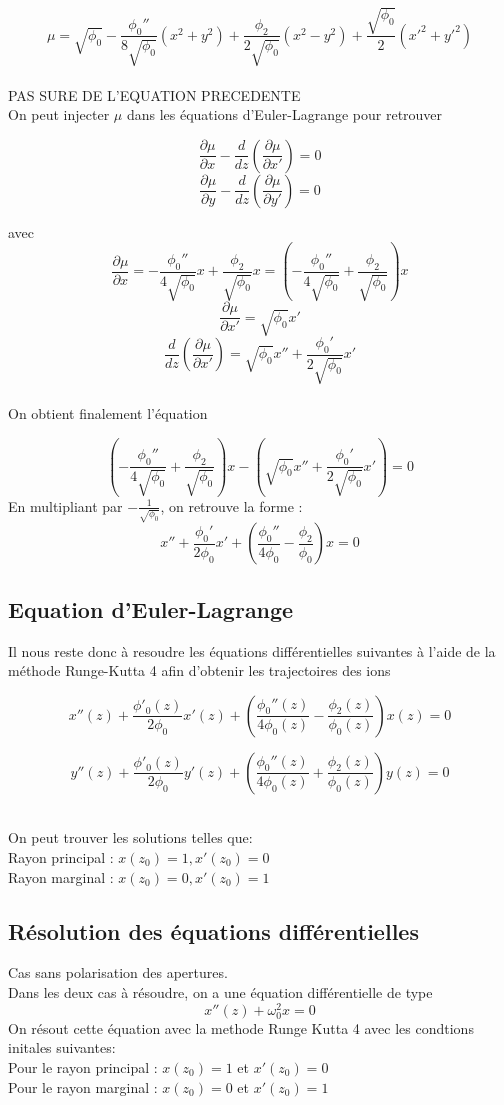\documentclass{article}
\begin{document}
\[
\mu = \sqrt{\phi_0}- \frac{\phi_0''}{8\sqrt{\phi_0}}(x^2+y^2) + \frac{\phi_2}{2\sqrt{\phi_0}}(x^2-y^2) + \frac{\sqrt{\phi_0}}{2}(x'^2+y'^2)
\]
\\
{\color{red}PAS SURE DE L'EQUATION PRECEDENTE}
\\

On peut injecter $\mu$ dans les équations d'Euler-Lagrange pour retrouver 

\[
\frac{\partial \mu }{\partial x}-\frac{d}{dz}\left(\frac{\partial \mu }{\partial x'}\right)=0
\]
\[
\frac{\partial \mu }{\partial y}-\frac{d}{dz}\left(\frac{\partial \mu }{\partial y'}\right)=0
\]

avec
\[
\frac{\partial \mu }{\partial x} = -\frac{\phi_0''}{4\sqrt{\phi_0}}x + \frac{\phi_2}{\sqrt{\phi_0}}x = \left(- \frac{\phi_0''}{4\sqrt{\phi_0}} + \frac{\phi_2}{\sqrt{\phi_0}} \right) x
\]
\[
\frac{\partial \mu }{\partial x'} = \sqrt{\phi_0}x'
\]
\[
\frac{d}{dz} \left( \frac{\partial \mu}{\partial x'} \right) = \sqrt{\phi_0}x'' + \frac{\phi_0'}{2\sqrt{\phi_0}}x'
\]
\\
On obtient finalement l'équation 

\[
\left( -\frac{\phi_0''}{4\sqrt{\phi_0}} + \frac{\phi_2}{\sqrt{\phi_0}} \right) x - \left( \sqrt{\phi_0}x'' + \frac{\phi_0'}{2\sqrt{\phi_0}}x' \right) = 0
\]
En multipliant par $-\frac{1}{\sqrt{\phi_0}}$, on retrouve la forme :
\[
x'' + \frac{\phi_0'}{2\phi_0}x' + \left( \frac{\phi_0''}{4\phi_0} - \frac{\phi_2}{\phi_0} \right)x = 0
\]


\subsection{Equation d'Euler-Lagrange }
Il nous reste donc à resoudre les équations différentielles suivantes à l'aide de la méthode Runge-Kutta 4 afin d'obtenir les trajectoires des ions

\[
x''(z) + \frac{\phi'_0(z)}{2\phi_0}x'(z) + \left( \frac{\phi_0''(z)}{4\phi_0(z)} -
\frac{\phi_2(z)}{\phi_0(z)}\right) x(z) = 0
\]

\[
y''(z) + \frac{\phi'_0(z)}{2\phi_0}y'(z) + \left(\frac{\phi_0''(z)}{4\phi_0(z)} +
\frac{\phi_2(z)}{\phi_0(z)}\right) y(z) = 0
\]
\

On peut trouver les solutions telles que:
\\
 Rayon principal : $x(z_0) = 1, x'(z_0) = 0$
\\
 Rayon marginal : $ x(z_0) = 0, x'(z_0) = 1$

\subsection{Résolution des équations différentielles}
{\color{blue}Cas sans polarisation des apertures.}
\\Dans les deux cas à résoudre, on a une équation différentielle de type 
\[
x''(z) + \omega_0^2 x = 0
\]
On résout cette équation avec la methode Runge Kutta 4 avec les condtions initales suivantes:\\
    Pour le rayon principal : $x(z_0) = 1$ et $x'(z_0) = 0$\\
    Pour le rayon marginal : $x(z_0) = 0$ et  $x'(z_0) = 1$ 
\\
\end{document}
